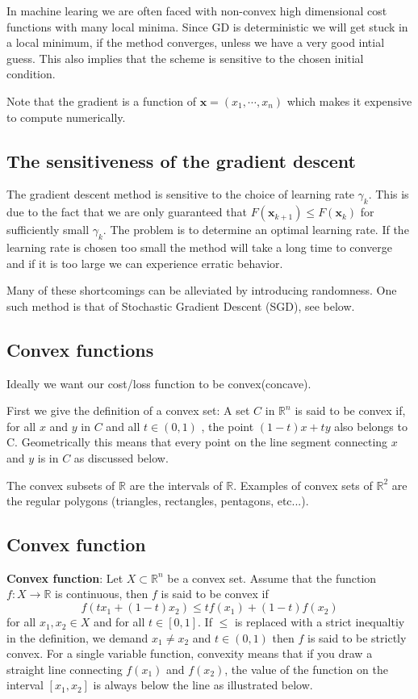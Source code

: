 \documentclass[%
oneside,                 %
final,                   %
10pt]{article}
\begin{document}
In machine learing we are often faced with non-convex high dimensional
cost functions with many local minima. Since GD is deterministic we
will get stuck in a local minimum, if the method converges, unless we
have a very good intial guess. This also implies that the scheme is
sensitive to the chosen initial condition.

Note that the gradient is a function of $\mathbf{x} =
(x_1,\cdots,x_n)$ which makes it expensive to compute numerically.


\subsection{The sensitiveness of the gradient descent}

The gradient descent method 
is sensitive to the choice of learning rate $\gamma_k$. This is due
to the fact that we are only guaranteed that $F(\mathbf{x}_{k+1}) \leq
F(\mathbf{x}_k)$ for sufficiently small $\gamma_k$. The problem is to
determine an optimal learning rate. If the learning rate is chosen too
small the method will take a long time to converge and if it is too
large we can experience erratic behavior.

Many of these shortcomings can be alleviated by introducing
randomness. One such method is that of Stochastic Gradient Descent
(SGD), see below.


\subsection{Convex functions}

Ideally we want our cost/loss function to be convex(concave).

First we give the definition of a convex set: A set $C$ in
$\mathbb{R}^n$ is said to be convex if, for all $x$ and $y$ in $C$ and
all $t \in (0,1)$ , the point $(1 − t)x + ty$ also belongs to
C. Geometrically this means that every point on the line segment
connecting $x$ and $y$ is in $C$ as discussed below.

The convex subsets of $\mathbb{R}$ are the intervals of
$\mathbb{R}$. Examples of convex sets of $\mathbb{R}^2$ are the
regular polygons (triangles, rectangles, pentagons, etc...).

\subsection{Convex function}

\textbf{Convex function}: Let $X \subset \mathbb{R}^n$ be a convex set. Assume that the function $f: X \rightarrow \mathbb{R}$ is continuous, then $f$ is said to be convex if $$f(tx_1 + (1-t)x_2) \leq tf(x_1) + (1-t)f(x_2) $$ for all $x_1, x_2 \in X$ and for all $t \in [0,1]$. If $\leq$ is replaced with a strict inequaltiy in the definition, we demand $x_1 \neq x_2$ and $t\in(0,1)$ then $f$ is said to be strictly convex. For a single variable function, convexity means that if you draw a straight line connecting $f(x_1)$ and $f(x_2)$, the value of the function on the interval $[x_1,x_2]$ is always below the line as illustrated below.
\end{document}
